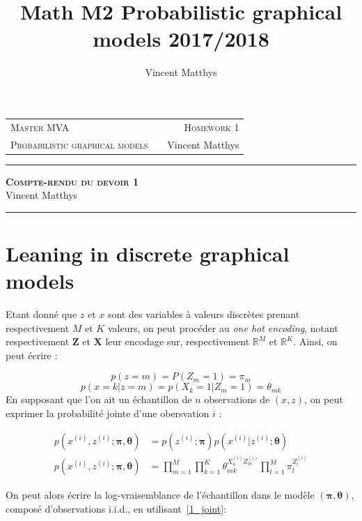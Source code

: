 \documentclass[12pt,a4paper,onecolumn]{article}
\title{Math M2 Probabilistic graphical models 2017/2018}
\author{Vincent Matthys}
\newcommand{\R}{\mathbb{R}} %
\begin{document}
\begin{tabularx}{0.8\textwidth}{@{} l X r @{} }
	{\textsc{Master MVA}}                   &  & \textsc{Homework 1} \\
	\textsc{Probabilistic graphical models} &  & {Vincent Matthys}   \\
\end{tabularx}
\vspace{1.5cm}
\begin{center}
	\rule[11pt]{5cm}{0.5pt}

	\textbf{\LARGE \textsc{Compte-rendu du devoir 1}}
	\vspace{0.5cm}\\
	Vincent Matthys\\
	\rule{5cm}{0.5pt}
	\vspace{1.5cm}
\end{center}

\section{Leaning in discrete graphical models}

Etant donné que \(z\) et \(x\) sont des variables à valeurs discrètes prenant respectivement \(M\) et \(K\) valeurs, on peut procéder au \textit{one hot encoding}, notant respectivement \(\bm{Z}\) et \(\bm{X}\) leur encodage sur, respectivement \(\R^M\) et \(\R^K\). Ainsi, on peut écrire :

\[
	p(z = m) = P(Z_m = 1) = \pi_m
\]
\[
	p(x = k | z = m) = p(X_k = 1 | Z_m = 1) = \theta_{mk}
\]
En supposant que l'on ait un échantillon de \(n\) observations de \((x, z)\), on peut exprimer la probabilité jointe d'une obersvation \(i\) :

\begin{equation}
	\begin{split}
		p(x^{(i)}, z^{(i)} ; \bm{\pi}, \bm{\theta}) & = p(z^{(i)} ; \bm{\pi}) p(x^{(i)} | z^{(i)} ; \bm{\theta})                                          \\
		p(x^{(i)}, z^{(i)} ; \bm{\pi}, \bm{\theta}) & = \prod_{m=1}^M \prod_{k=1}^K \theta_{mk}^{X_k^{(i)} Z_m^{(i)}} \prod_{l = 1}^M\pi_l^{Z_l^{(i)}}
	\end{split}
	\label{1_joint}
\end{equation}

On peut alors écrire la log-vraisemblance de l'échantillon dans le modèle \(( \bm{\pi}, \bm{\theta})\), composé d'observations i.i.d., en utilisant~\eqref{1_joint}:
\end{document}
